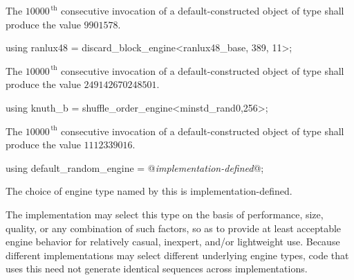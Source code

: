 \begin{itemdescr}
\pnum\required
 The $10000^{\,\mathrm{th}}$ consecutive invocation
 of a default-constructed object
 of type 
 shall produce the value
 $ 9901578 $.
\end{itemdescr}

%
%
\begin{itemdecl}
using ranlux48 = discard_block_engine<ranlux48_base, 389, 11>;
\end{itemdecl}

\begin{itemdescr}
\pnum\required
 The $10000^{\,\mathrm{th}}$ consecutive invocation
 of a default-constructed object
 of type 
 shall produce the value
 $ 249142670248501 $.
\end{itemdescr}

%
%
\begin{itemdecl}
using knuth_b = shuffle_order_engine<minstd_rand0,256>;
\end{itemdecl}

\begin{itemdescr}
\pnum\required
 The $10000^{\,\mathrm{th}}$ consecutive invocation
 of a default-constructed object
 of type 
 shall produce the value $1112339016$.
\end{itemdescr}%

%
%
\begin{itemdecl}
using default_random_engine = @\textit{implementation-defined}@;
\end{itemdecl}

\begin{itemdescr}
\pnum\remark
The choice of engine type
named by this 
is implementation-defined.
\begin{note}
 The implementation
 may select this type
 on the basis of performance,
 size,
 quality,
 or any combination of such factors,
 so as to provide at least acceptable engine behavior
 for relatively casual, inexpert, and/or lightweight use.
 Because different implementations
 may select different underlying engine types,
 code that uses this 
 need not generate identical sequences across implementations.
\end{note}
\end{itemdescr}%
%
%


